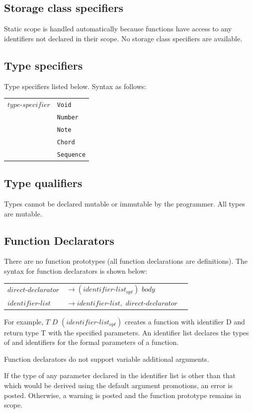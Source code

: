\documentclass[12pt,A4]{book}
\begin{document}
\subsection{Storage class specifiers}
Static scope is handled automatically because functions have access to any identifiers not declared in their scope. No storage class specifiers are available.
\subsection{Type specifiers}
Type specifiers listed below.  Syntax as follows:

\begin{tabular}{l l}
$type\mbox{-}specifier$  & \verb|Void| \\
& \verb|Number|\\
& \verb|Note|\\
& \verb|Chord|\\
& \verb|Sequence|
\end{tabular}

\subsection{Type qualifiers}
Types cannot be declared mutable or immutable by the programmer.  All types are mutable.
\subsection{Function Declarators}
There are no function prototypes (all function declarations are definitions).  The syntax for function declarators is shown below:

\begin{tabular}{l l l}
$direct\mbox{-}declarator $ & $\rightarrow (identifier\mbox{-}list_{opt})$ { $body$ } \\
$identifier\mbox{-}list$  & $\rightarrow identifier\mbox{-}list,$ $direct\mbox{-}declarator$
\end{tabular}

For example,
$T$ $D$ $(identifier\mbox{-}list_{opt})$
creates a function with identifier D and return type T with the specified parameters. An identifier list declares the types of and identifiers for the formal parameters of a function.

Function declarators do not support variable additional arguments.  

If the type of any parameter declared in the identifier list is other than that which would be derived using the default argument promotions, an error is posted.  Otherwise, a warning is posted and the function prototype remains in scope.
\end{document}
